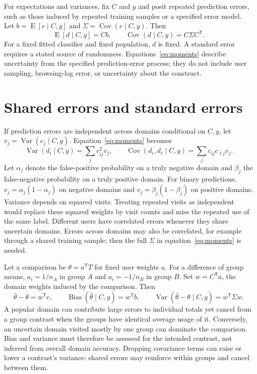 \documentclass[11pt,letterpaper]{article}
\newcommand{\E}{\operatorname{E}}
\newcommand{\Var}{\operatorname{Var}}
\newcommand{\Cov}{\operatorname{Cov}}
\begin{document}
For expectations and variances, fix $C$ and $y$ and posit repeated prediction
errors, such as those induced by repeated training samples or a specified error
model. Let $b=\E[e\mid C,y]$ and $\Sigma=\Cov(e\mid C,y)$. Then
\begin{equation}\label{eq:moments}
 \E[d\mid C,y]=Cb,\qquad \Cov(d\mid C,y)=C\Sigma C^{\mathsf T}.
\end{equation}
For a fixed fitted classifier and fixed population, $d$ is fixed. A standard
error requires a stated source of randomness. Equations~\eqref{eq:moments}
describe uncertainty from the specified prediction-error process; they do not
include user sampling, browsing-log error, or uncertainty about the construct.



\section{Shared errors and standard errors}
If prediction errors are independent across domains conditional on $C,y$, let
$v_j=\Var(e_j\mid C,y)$. Equation~\eqref{eq:moments} becomes
\begin{equation}\label{eq:covariance}
 \Var(d_i\mid C,y)=\sum_j c_{ij}^2v_j,\qquad
 \Cov(d_i,d_\ell\mid C,y)=\sum_j c_{ij}c_{\ell j}v_j.
\end{equation}
Let $\alpha_j$ denote the false-positive probability on a truly negative
domain and $\beta_j$ the false-negative probability on a truly positive domain.
For binary predictions,
$v_j=\alpha_j(1-\alpha_j)$ on negative domains and
$v_j=\beta_j(1-\beta_j)$ on positive domains. Variance depends on squared
visits. Treating repeated visits as independent would replace these squared
weights by visit counts and miss the repeated use of the same label.
Different users have correlated errors whenever they share uncertain domains.
Errors across domains may also be correlated, for example through a shared
training sample; then the full $\Sigma$ in equation~\eqref{eq:moments} is needed.

Let a comparison be $\theta=a^{\mathsf T}T$ for fixed user weights $a$.
For a difference of group means, $a_i=1/n_A$ in group $A$ and $a_i=-1/n_B$
in group $B$. Set $w=C^{\mathsf T}a$, the domain weights induced by the
comparison. Then
\begin{equation}\label{eq:contrast}
 \widehat\theta-\theta=w^{\mathsf T}e,\qquad
 \operatorname{Bias}(\widehat\theta\mid C,y)=w^{\mathsf T}b,\qquad
 \Var(\widehat\theta-\theta\mid C,y)=w^{\mathsf T}\Sigma w.
\end{equation}
A popular domain can contribute large errors to individual totals yet cancel
from a group contrast when the groups have identical average usage of it.
Conversely, an uncertain domain visited mostly by one group can dominate the
comparison. Bias and variance must therefore be assessed for the intended
contrast, not inferred from overall domain accuracy. Dropping covariance
terms can raise or lower a contrast's variance: shared errors may reinforce
within groups and cancel between them.
\end{document}
